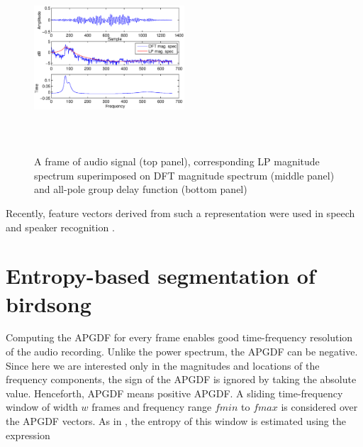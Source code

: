 \documentclass[a4paper]{article}
\begin{document}
\begin{figure}[h]

\includegraphics[width=0.5\textwidth,height=7cm]
{apgd.eps}
\caption{ A frame of audio signal (top panel), corresponding LP
magnitude spectrum superimposed on DFT magnitude spectrum (middle panel) and
all-pole group delay function (bottom panel)  }
\label{fig:all-pole}
\end{figure}


Recently, feature vectors
derived from such a representation were used in speech \cite{drugman} and speaker
recognition \cite{padman}. 









\section{Entropy-based segmentation of birdsong}

Computing the APGDF for every frame enables good time-frequency resolution of
the audio recording. Unlike the power spectrum, the APGDF can be negative.
Since here we are interested only in the magnitudes and locations of the
frequency components, the sign of the APGDF is ignored by taking the absolute
value. Henceforth, APGDF means positive APGDF.  A sliding time-frequency window
of width $w$ frames and frequency range $fmin$ to $fmax$ is considered over the
APGDF vectors. As in \cite{wang2013}, the entropy of this window is estimated
using the expression
\end{document}

